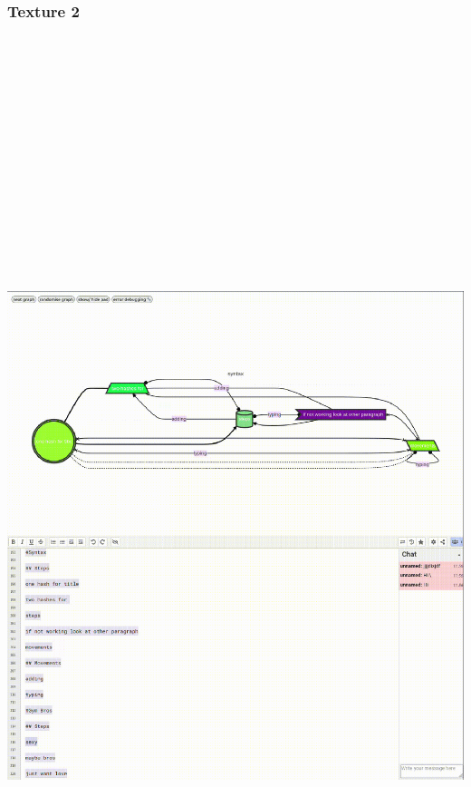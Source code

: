 \hypertarget{texture-2}{%
\subsubsection[Texture
2]{\texorpdfstring{\protect\hypertarget{anchor}{}{}Texture
2}{Texture 2}}\label{texture-2}}

\includegraphics[width=18.69444in,height=20in]{./media_03_Disobedient_Action_Research_Cycles/Pictures/2.png}

